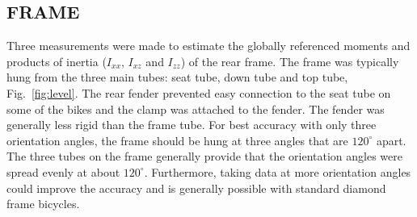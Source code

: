 \documentclass{bmd2010p}
\begin{document}
\subsection{FRAME}
Three measurements were made to estimate the globally referenced moments and
products of inertia ($I_{xx}$, $I_{xz}$ and $I_{zz}$) of the rear frame. The
frame was typically hung from the three main tubes: seat tube, down tube
and top tube, Fig.~\ref{fig:level}. The rear fender prevented easy connection to the seat tube on
some of the bikes and the clamp was attached to the fender. The fender was
generally less rigid than the frame tube. For best accuracy with only three
orientation angles, the frame should be hung at three angles that are
$120^\circ$ apart. The three tubes on the frame generally provide that the
orientation angles were spread evenly at about $120^\circ$. Furthermore, taking
data at more orientation angles could improve the accuracy and
is generally possible with standard diamond frame bicycles.
\end{document}
